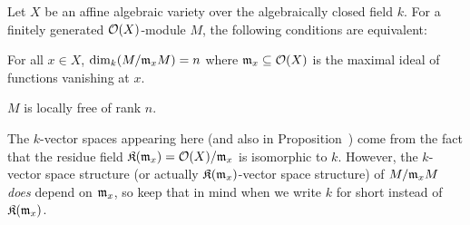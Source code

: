 \documentclass[a4paper,parskip=half,numbers=enddot, DIV=12, headheight=30pt]{scrreprt}
\begin{document}
\begin{prop}
    Let $X$ be an affine algebraic variety over the algebraically closed field $k$. For a finitely generated $\mathcal{O}(X)$-module $M$, the following conditions are equivalent:
    \begin{alphanumerate}
        \item 
            For all $x\in X$, $\dim_k(M/\mathfrak{m}_x M)=n$ where $\mathfrak{m}_x\subseteq\mathcal{O}(X)$ is the maximal ideal of functions vanishing at $x$.
        \item 
            $M$ is locally free of rank $n$.
    \end{alphanumerate}
\end{prop}
\begin{rem*}
	The $k$-vector spaces appearing here (and also in Proposition~) come from the fact that the residue field $\mathfrak{K}(\mathfrak{m}_x)=\mathcal{O}(X)/\mathfrak{m}_x$ is isomorphic to $k$. However, the $k$-vector space structure (or actually $\mathfrak{K}(\mathfrak{m}_x)$-vector space structure) of $M/\mathfrak{m}_xM$ \emph{does} depend on $\mathfrak{m}_x$, so keep that in mind when we write $k$ for short instead of $\mathfrak{K}(\mathfrak{m}_x)$.
\end{rem*}
\end{document}
